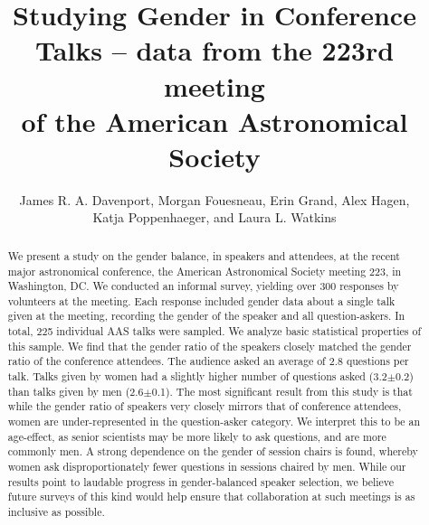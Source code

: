 \documentclass[iop]{emulateapj}
\begin{document}
\title{Studying Gender in Conference Talks -- data from the 223rd meeting\\
 of the American Astronomical Society}

\author{
	James R. A. Davenport,
	Morgan Fouesneau,
	Erin Grand,
	Alex Hagen,\\
	Katja Poppenhaeger,
	and Laura L. Watkins
	}





\begin{abstract}
We present a study on the gender balance, in speakers and attendees, at the recent major astronomical conference, the American Astronomical Society meeting 223, in Washington, DC. We conducted an informal survey, yielding over 300 responses by volunteers at the meeting. Each response included gender data about a single talk given at the meeting, recording the gender of the speaker and all question-askers. In total, 225 individual AAS talks were sampled. We analyze basic statistical properties of this sample. We find that the gender ratio of the speakers closely matched the gender ratio of the conference attendees. The audience asked an average of 2.8 questions per talk. Talks given by women had a slightly higher number of questions asked (3.2$\pm$0.2) than talks given by men (2.6$\pm$0.1).
 The most significant result from this study is that while the gender ratio of speakers very closely mirrors that of conference attendees, women are under-represented in the question-asker category.  We interpret this to be an age-effect, as senior scientists may be more likely to ask questions, and are more commonly men. A strong dependence on the gender of session chairs is found, whereby women ask disproportionately fewer questions in sessions chaired by men. While our results point to laudable progress in gender-balanced speaker selection, we believe future surveys of this kind would help ensure that collaboration at such meetings is as inclusive as possible.
\end{abstract}
\end{document}
